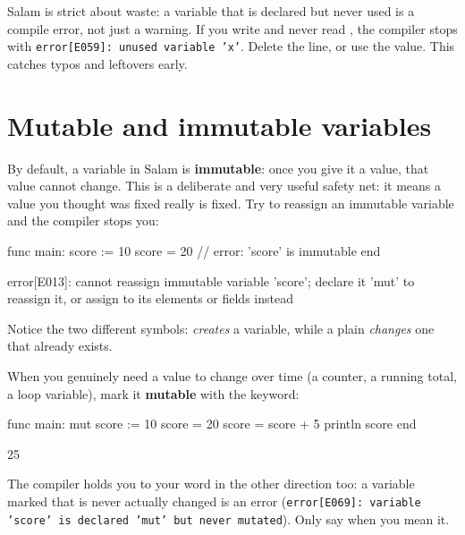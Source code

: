 \begin{warn}
Salam is strict about waste: a variable that is declared but never used is a
compile error, not just a warning. If you write  and never read
, the compiler stops with
\texttt{error[E059]: unused variable 'x'}. Delete the line, or use the %
value. This catches typos and leftovers early.
\end{warn}

\section{Mutable and immutable variables}

By default, a variable in Salam is \textbf{immutable}: once you give it a value,
that value cannot change. This is a deliberate and very useful safety net: it
means a value you thought was fixed really is fixed. Try to reassign an immutable
variable and the compiler stops you:

\begin{salamen}
func main:
    score := 10
    score = 20        // error: 'score' is immutable
end
\end{salamen}

\begin{shell}
error[E013]: cannot reassign immutable variable 'score'; declare it 'mut' to reassign it, or assign to its elements or fields instead
\end{shell}

\noindent Notice the two different symbols: \code{:=} \emph{creates} a variable,
while a plain \code{=} \emph{changes} one that already exists.

When you genuinely need a value to change over time (a counter, a running
total, a loop variable), mark it \textbf{mutable} with the  keyword:

\begin{salamen}
func main:
    mut score := 10
    score = 20
    score = score + 5
    println score
end
\end{salamen}

\begin{progout}
25
\end{progout}

The compiler holds you to your word in the other direction too: a variable
marked  that is never actually changed is an error
(\texttt{error[E069]: variable 'score' is declared 'mut' but never mutated}). %
Only say  when you mean it.

